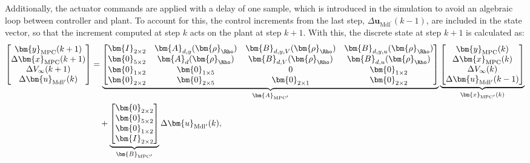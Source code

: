 Additionally, the actuator commands are applied with a delay of one sample, which is introduced in the simulation to avoid an algebraic loop between controller and plant. To account for this, the control increments from the last step, $\Delta \bm{u}_{\text{Mdl}^\prime}(k-1)$, are included in the state vector, so that the increment computed at step $k$ acts on the plant at step $k+1$. 
With this, the discrete state at step $k+1$ is calculated as:
\begin{equation} \label{eq:FinalStateSpace}
    \begin{aligned}
        \begin{bmatrix}
            \bm{y}_{\text{MPC}}(k+1) \\
            \Delta \bm{x}_{\text{MPC}}(k+1) \\
            \Delta V_{\infty}(k+1) \\
            \Delta \bm{u}_{\text{Mdl}^\prime}(k)
        \end{bmatrix}
        &=
        \underbrace{\begin{bmatrix}
                \bm{I}_{2\times2} & \bm{A}_{d,y}(\bm{\rho}_\Rho) & \bm{B}_{d,y,V}(\bm{\rho}_\Rho) & \bm{B}_{d,y,u}(\bm{\rho}_\Rho) \\
                \bm{0}_{5\times2} & \bm{A}_{d}(\bm{\rho}_\Rho) & \bm{B}_{d,V}(\bm{\rho}_\Rho) & \bm{B}_{d,u}(\bm{\rho}_\Rho) \\
                \bm{0}_{1\times2} & \bm{0}_{1\times5} & 0 & \bm{0}_{1\times2} \\
                \bm{0}_{2\times2} & \bm{0}_{2\times5} & \bm{0}_{2\times1} & \bm{0}_{2\times2}
        \end{bmatrix}}_{\bm{A}_{\text{MPC}^\prime}}
        \underbrace{\begin{bmatrix}
                \bm{y}_{\text{MPC}}(k) \\
                \Delta \bm{x}_{\text{MPC}}(k) \\
                \Delta V_{\infty}(k) \\
                \Delta \bm{u}_{\text{Mdl}^\prime}(k-1)
        \end{bmatrix}}_{\bm{x}_{\text{MPC}^\prime}(k)} \\
        &\quad +
        \underbrace{\begin{bmatrix}
                \bm{0}_{2\times2} \\
                \bm{0}_{5\times2} \\
                \bm{0}_{1\times2} \\
                \bm{I}_{2\times2}
        \end{bmatrix}}_{\bm{B}_{\text{MPC}^\prime}}
        \Delta \bm{u}_{\text{Mdl}^\prime}(k),
    \end{aligned}
\end{equation}
